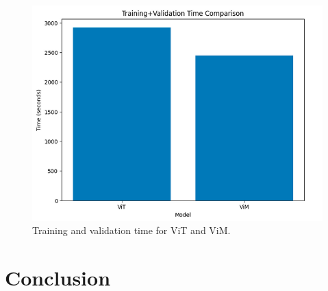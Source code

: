 \documentclass[conference]{IEEEtran}
\begin{document}
\begin{figure}[!t]
    \centering
    \includegraphics[width=\columnwidth]{imgs/time_comparison.png}
    \caption{Training and validation time for ViT and ViM.}
    \label{fig:ViMViTTrainingValidationTime}
\end{figure}

\section{Conclusion}
\end{document}

